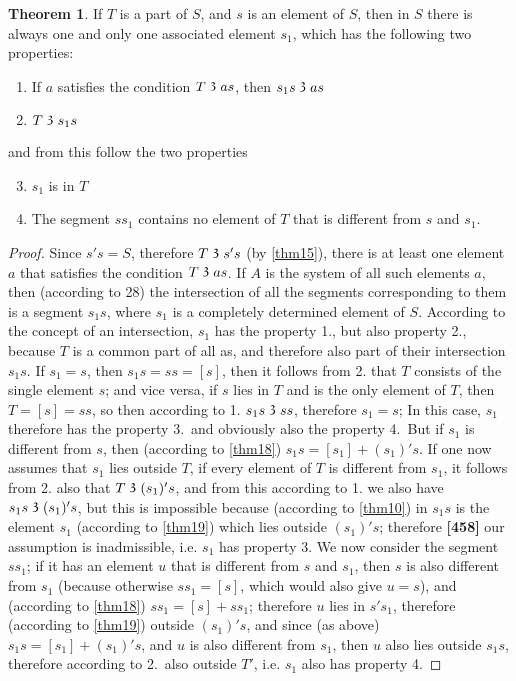 \documentclass[leqno]{article}
\theoremstyle{definition}
\newtheorem{theorem}{Theorem}
\newcommand\partof{\mathrel{\raisebox{0.45ex}{$\mathfrak{3}$}}}
\begin{document}
\begin{theorem}\label{thm29}
If $T$ is a part of $S$, and $s$ is an element of $S$, then in $S$ there is always one and only one associated element $s_1$, which has the following two properties:
\begin{enumerate}[1.]
	\item If $a$ satisfies the condition $T \partof as$, then $s_1s \partof as$
	\item $T \partof s_1s$
\end{enumerate}
and from this follow the two properties
\begin{enumerate}[1.]
	\setcounter{enumi}{2}
	\item $s_1$ is in $T$
	\item The segment $ss_1$ contains no element of $T$ that is different from $s$ and $s_1$.
\end{enumerate}
\end{theorem}
\begin{proof}
Since $s's = S$, therefore $T \partof s's$ (by \ref{thm15}), there is at least one element $a$ that satisfies the condition $T \partof as$. If $A$ is the system of all such elements $a$, then (according to 28) the intersection of all the segments corresponding to them is a segment $s_1s$, where $s_1$ is a completely determined element of $S$. 
According to the concept of an intersection, $s_1$ has the property 1., but also property 2., because $T$ is a common part of all as, and therefore also part of their intersection $s_1s$. If $s_1=s$, then $s_1s=ss=[s]$, then it follows from 2. that $T$ consists of the single element $s$; and vice versa, if $s$ lies in $T$ and is the only element of $T$, then $T = [s] = ss$, so then according to 1. $s_1s \partof ss$, therefore $s_1 = s$; In this case, $s_1$ therefore has the property 3.\ and obviously also the property 4.\ But if $s_1$ is different from $s$, then (according to \ref{thm18}) $s_1s= [s_1]+(s_1)'s$. 
If one now assumes that $s_1$ lies outside $T$, if every element of $T$ is different from $s_1$, it follows from 2. also that $T \partof (s_1)'s$, and from this according to 1. we also have $s_1s \partof (s_1)'s$, but this is impossible because (according to \ref{thm10}) in $s_1s$ is the element $s_1$ (according to \ref{thm19}) which lies outside $(s_1)'s$; therefore 
\textbf{[458]}
our assumption is inadmissible, i.e. $s_1$ has property 3. 
We now consider the segment $ss_1$; if it has an element $u$ that is different from $s$ and $s_1$, then $s$ is also different from $s_1$ (because otherwise $ss_1 = [s]$, which would also give $u=s$), and (according to \ref{thm18}) $ss_1 = [s] + ss_1$; therefore $u$ lies in $s's_1$, therefore (according to \ref{thm19}) outside $(s_1)'s$, and since (as above) $s_1s= [s_1] + (s_1)'s$, and $u$ is also different from $s_1$, then $u$ also lies outside $s_1s$, therefore according to 2.\ also outside $T'$, i.e. $s_1$ also has property 4.
\end{proof}
\end{document}

